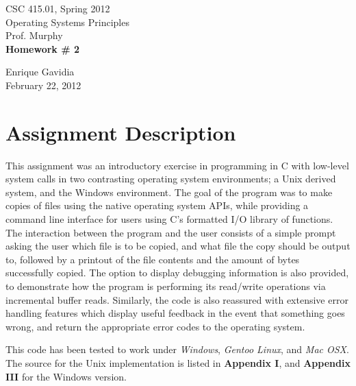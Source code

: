 \documentclass[12pt]{article}
\def \name       {Enrique Gavidia}
\def \coursenum  {CSC 415.01}
\def \coursename {Operating Systems Principles}
\def \instructor {Prof. Murphy}
\def \semester   {Spring 2012}
\def \assignment {Homework \# 2}
\def \duedate    {February 22, 2012}
\begin{document}
\begin{titlepage}
  \begin{center}

    \LARGE{\coursenum, \semester \\ \coursename}\\
    \Large{\instructor}\\

    \vfill
    \textbf{\Huge \assignment}\\
    \vfill
    
    \Large{\name}\\ 
    \large{\duedate}
    
  \end{center}
\end{titlepage}


\section*{Assignment Description}
This assignment was an introductory exercise in programming in C with low-level system calls in two contrasting operating 
system environments; a Unix derived system, and the Windows environment. The goal of the program was to make copies of files 
using the native operating system APIs, while providing a command line interface for users using C's formatted I/O library of
functions.  The interaction between the program and the user consists of a simple prompt asking the user which file is to be copied,
and what file the copy should be output to, followed by a printout of the file contents and the amount of bytes successfully copied.
The option to display debugging information is also provided, to demonstrate how the program is performing its read/write operations
via incremental buffer reads.  Similarly, the code is also reassured with extensive error handling features which display useful feedback
in the event that something goes wrong, and return the appropriate error codes to the operating system.

This code has been tested to work under \textsl{Windows}, \textsl{Gentoo Linux}, and \textsl{Mac OSX}. 
The source for the Unix implementation is listed in \textbf{Appendix I}, and \textbf{Appendix III} for the Windows version.
\end{document}
